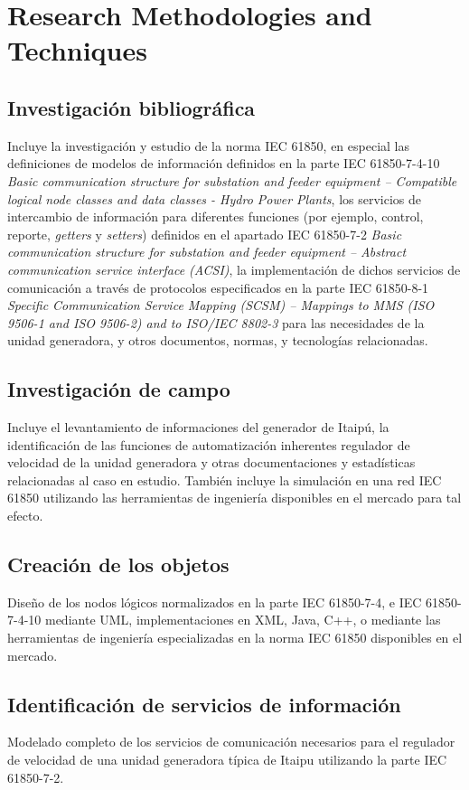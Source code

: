 \section{Research Methodologies and Techniques}
	\subsection{Investigaci\'on bibliogr\'afica} 
		Incluye la investigaci\'on y estudio de la norma IEC 61850, en especial las
		definiciones de modelos de informaci\'on definidos en la parte IEC
		61850-7-4-10 \emph{Basic communication structure for substation and feeder
		equipment – Compatible logical node classes and data classes - Hydro Power
		Plants}, los servicios de intercambio de informaci\'on para diferentes
		funciones (por ejemplo, control, reporte, \emph{getters} y \emph{setters})
		definidos en el apartado IEC 61850-7-2 \emph{Basic communication structure
		for substation and feeder equipment – Abstract communication service
		interface (ACSI)}, la implementaci\'on de dichos servicios de comunicaci\'on
		a trav\'es de protocolos especificados en la parte IEC 61850-8-1
		\emph{Specific Communication Service Mapping (SCSM) – Mappings to MMS (ISO
		9506-1 and ISO 9506-2) and to ISO/IEC 8802-3} para las necesidades de la
		unidad generadora, y otros documentos, normas, y tecnolog\'ias relacionadas.
	\subsection{Investigaci\'on de campo}
		Incluye el levantamiento de informaciones del generador de Itaip\'u, la
		identificaci\'on de las funciones de automatizaci\'on inherentes regulador de
		velocidad de la unidad generadora y otras documentaciones y estad\'isticas
		relacionadas al caso en estudio. Tambi\'en incluye la simulaci\'on en una
		red IEC 61850 utilizando las herramientas de ingenier\'ia disponibles en el
		mercado para tal efecto.
	\subsection{Creaci\'on de los objetos}
		Dise\~no de los nodos l\'ogicos normalizados en la parte IEC 61850-7-4, e
		IEC 61850-7-4-10 mediante UML, implementaciones en XML, Java, C++, o
		mediante las herramientas de ingenier\'ia especializadas en la norma IEC
		61850 disponibles en el mercado.
	\subsection{Identificaci\'on de servicios de informaci\'on}
		Modelado completo de los servicios de comunicaci\'on necesarios para el
		regulador de velocidad de una unidad generadora t\'ipica de Itaipu
		utilizando la parte IEC 61850-7-2.
